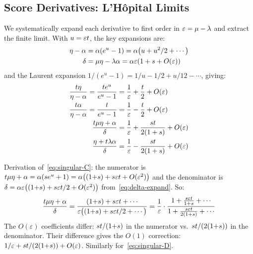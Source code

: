 \subsection{Score Derivatives: L'H\^opital Limits}
\label{sec:score-limits}

We systematically expand each derivative to first order in
$\varepsilon = \mu - \lambda$ and extract the finite limit.
With $u = \varepsilon t$, the key expansions are:
\begin{align}
\eta - \alpha &= \alpha(e^u - 1)
  = \alpha\bigl(u + u^2/2 + \cdots\bigr)
\label{eq:eta-alpha-expand}
\\
\delta &= \mu\eta - \lambda\alpha
  = \alpha\varepsilon(1 + s + O(\varepsilon))
\label{eq:delta-expand}
\end{align}
and the Laurent expansion $1/(e^u - 1) = 1/u - 1/2 + u/12 - \cdots$,
giving:
\begin{align}
\frac{t\eta}{\eta - \alpha}
  = \frac{t e^u}{e^u - 1}
  &= \frac{1}{\varepsilon} + \frac{t}{2} + O(\varepsilon)
\label{eq:singular-A}
\\
\frac{t\alpha}{\eta - \alpha}
  = \frac{t}{e^u - 1}
  &= \frac{1}{\varepsilon} - \frac{t}{2} + O(\varepsilon)
\label{eq:singular-B}
\\
\frac{t\mu\eta + \alpha}{\delta}
  &= \frac{1}{\varepsilon} + \frac{st}{2(1+s)} + O(\varepsilon)
\label{eq:singular-C}
\\
\frac{\eta + t\lambda\alpha}{\delta}
  &= \frac{1}{\varepsilon} - \frac{st}{2(1+s)} + O(\varepsilon)
\label{eq:singular-D}
\end{align}

Derivation of~\eqref{eq:singular-C}: the numerator is
$t\mu\eta + \alpha
= \alpha(se^u + 1)
= \alpha\bigl((1{+}s) + s\varepsilon t + O(\varepsilon^2)\bigr)$
and the denominator is
$\delta = \alpha\varepsilon\bigl((1{+}s) + s\varepsilon t/2 + O(\varepsilon^2)\bigr)$
from~\eqref{eq:delta-expand}.  So:
\[
\frac{t\mu\eta + \alpha}{\delta}
= \frac{(1{+}s) + s\varepsilon t + \cdots}
       {\varepsilon\bigl((1{+}s) + s\varepsilon t/2 + \cdots\bigr)}
= \frac{1}{\varepsilon}
  \cdot\frac{1 + \frac{s\varepsilon t}{1+s} + \cdots}
            {1 + \frac{s\varepsilon t}{2(1+s)} + \cdots}
\]
The $O(\varepsilon)$ coefficients differ: $st/(1{+}s)$ in the
numerator vs.\ $st/(2(1{+}s))$ in the denominator.
Their difference gives the $O(1)$ correction:
$1/\varepsilon + st/(2(1{+}s)) + O(\varepsilon)$.
Similarly for~\eqref{eq:singular-D}.

